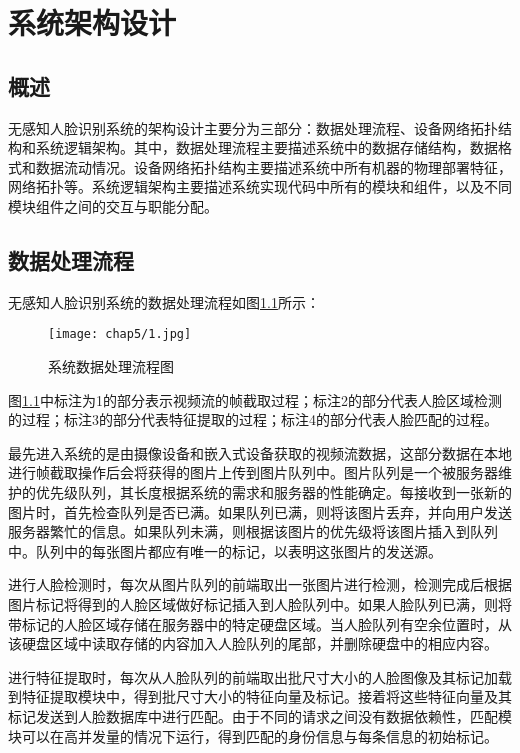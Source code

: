 \chapter{系统架构设计}

\section{概述}

无感知人脸识别系统的架构设计主要分为三部分：数据处理流程、设备网络拓扑结构和系统逻辑架构。其中，数据处理流程主要描述系统中的数据存储结构，数据格式和数据流动情况。设备网络拓扑结构主要描述系统中所有机器的物理部署特征，网络拓扑等。系统逻辑架构主要描述系统实现代码中所有的模块和组件，以及不同模块组件之间的交互与职能分配。

\section{数据处理流程}

无感知人脸识别系统的数据处理流程如图\ref{fig:chap5:data}所示：

\begin{figure}[!htp]
	\centering
	\texttt{[image: chap5/1.jpg]}
	\caption{系统数据处理流程图}
	\label{fig:chap5:data}
\end{figure}

图\ref{fig:chap5:data}中标注为1的部分表示视频流的帧截取过程；标注2的部分代表人脸区域检测的过程；标注3的部分代表特征提取的过程；标注4的部分代表人脸匹配的过程。

最先进入系统的是由摄像设备和嵌入式设备获取的视频流数据，这部分数据在本地进行帧截取操作后会将获得的图片上传到图片队列中。图片队列是一个被服务器维护的优先级队列，其长度根据系统的需求和服务器的性能确定。每接收到一张新的图片时，首先检查队列是否已满。如果队列已满，则将该图片丢弃，并向用户发送服务器繁忙的信息。如果队列未满，则根据该图片的优先级将该图片插入到队列中。队列中的每张图片都应有唯一的标记，以表明这张图片的发送源。

进行人脸检测时，每次从图片队列的前端取出一张图片进行检测，检测完成后根据图片标记将得到的人脸区域做好标记插入到人脸队列中。如果人脸队列已满，则将带标记的人脸区域存储在服务器中的特定硬盘区域。当人脸队列有空余位置时，从该硬盘区域中读取存储的内容加入人脸队列的尾部，并删除硬盘中的相应内容。

进行特征提取时，每次从人脸队列的前端取出批尺寸大小的人脸图像及其标记加载到特征提取模块中，得到批尺寸大小的特征向量及标记。接着将这些特征向量及其标记发送到人脸数据库中进行匹配。由于不同的请求之间没有数据依赖性，匹配模块可以在高并发量的情况下运行，得到匹配的身份信息与每条信息的初始标记。

